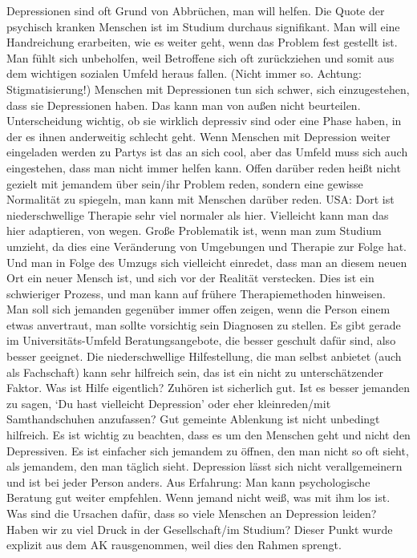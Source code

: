     Depressionen sind oft Grund von Abbrüchen, man will helfen.
    Die Quote der psychisch kranken Menschen ist im Studium durchaus signifikant.
    Man will eine Handreichung erarbeiten, wie es weiter geht, wenn das Problem fest gestellt ist.
    Man fühlt sich unbeholfen, weil Betroffene sich oft zurückziehen und somit aus dem wichtigen sozialen Umfeld heraus fallen. (Nicht immer so. Achtung: Stigmatisierung!)
    Menschen mit Depressionen tun sich schwer, sich einzugestehen, dass sie Depressionen haben. Das kann man von außen nicht beurteilen.
    Unterscheidung wichtig, ob sie wirklich depressiv sind oder eine Phase haben, in der es ihnen anderweitig schlecht geht.
    Wenn Menschen mit Depression weiter eingeladen werden zu Partys ist das an sich cool, aber das Umfeld muss sich auch eingestehen, dass man nicht immer helfen kann.
    Offen darüber reden heißt nicht gezielt mit jemandem über sein/ihr Problem reden, sondern eine gewisse Normalität zu spiegeln, man kann mit Menschen darüber reden.
    USA: Dort ist niederschwellige Therapie sehr viel normaler als hier. Vielleicht kann man das hier adaptieren, von wegen.
    Große Problematik ist, wenn man zum Studium umzieht, da dies eine Veränderung von Umgebungen und Therapie zur Folge hat. Und man in Folge des Umzugs sich vielleicht einredet, dass man an diesem neuen Ort ein neuer Mensch ist, und sich vor der Realität verstecken. Dies ist ein schwieriger Prozess, und man kann auf frühere Therapiemethoden hinweisen.
    Man soll sich jemanden gegenüber immer offen zeigen, wenn die Person einem etwas anvertraut, man sollte vorsichtig sein Diagnosen zu stellen. Es gibt gerade im Universitäts-Umfeld Beratungsangebote, die besser geschult dafür sind, also besser geeignet.
    Die niederschwellige Hilfestellung, die man selbst anbietet (auch als Fachschaft) kann sehr hilfreich sein, das ist ein nicht zu unterschätzender Faktor.
    Was ist Hilfe eigentlich? Zuhören ist sicherlich gut. Ist es besser jemanden zu sagen, ‘Du hast vielleicht Depression’ oder eher kleinreden/mit Samthandschuhen anzufassen?
    Gut gemeinte Ablenkung ist nicht unbedingt hilfreich.
    Es ist wichtig zu beachten, dass es um den Menschen geht und nicht den Depressiven.
    Es ist einfacher sich jemandem zu öffnen, den man nicht so oft sieht, als jemandem, den man täglich sieht.
    Depression lässt sich nicht verallgemeinern und ist bei jeder Person anders.
    Aus Erfahrung: Man kann psychologische Beratung gut weiter empfehlen. Wenn jemand nicht weiß, was mit ihm los ist.
    Was sind die Ursachen dafür, dass so viele Menschen an Depression leiden? Haben wir zu viel Druck in der Gesellschaft/im Studium? Dieser Punkt wurde explizit aus dem AK rausgenommen, weil dies den Rahmen sprengt.
